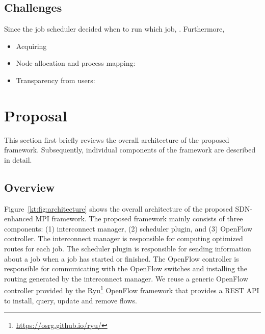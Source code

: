 \documentclass[graybox]{svmult}
\begin{document}
\subsection{Challenges}


Since the job scheduler decided when to run which job,
. Furthermore,

\begin{itemize}
    \item Acquiring
    \item Node allocation and process mapping:
    \item Transparency from users:
\end{itemize}

\section{Proposal}\label{kt:sec:iii}

This section first briefly reviews the overall architecture of the proposed
framework. Subsequently, individual components of the framework are described
in detail.

\subsection{Overview}

Figure~\ref{kt:fig:architecture} shows the overall architecture of the
proposed SDN-enhanced MPI framework. The proposed framework mainly consists of
three components: (1) interconnect manager, (2) scheduler plugin, and (3)
OpenFlow controller. The interconnect manager is responsible for computing
optimized routes  for each job. The scheduler plugin is responsible
for sending information about a job when a job has started or finished. The
OpenFlow controller is responsible for communicating with the OpenFlow
switches and installing the routing generated by the interconnect manager.
We reuse a generic OpenFlow controller provided by the
Ryu\footnote{\url{https://osrg.github.io/ryu/}} OpenFlow framework that
provides a REST API to install, query, update and remove flows.
\end{document}
